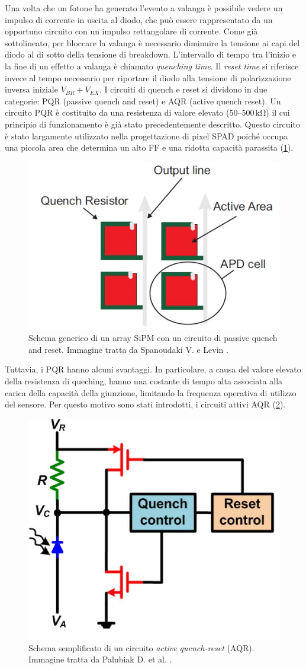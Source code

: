 Una volta che un fotone ha generato l'evento a valanga è possibile vedere un impulso di corrente in uscita al diodo, che può essere rappresentato da un opportuno circuito con un impulso rettangolare di corrente. Come già sottolineato, per bloccare la valanga è necessario diminuire la tensione ai capi del diodo al di sotto della tensione di breakdown. L'intervallo di tempo tra l'inizio e la fine di un effetto a valanga è chiamato \textit{quenching time}. Il \textit{reset time} si riferisce invece al tempo necessario per riportare il diodo alla tensione di polarizzazione inversa iniziale $V_{BR}+V_{EX}$. I circuiti di quench e reset si dividono in due categorie: PQR (passive quench and reset) e AQR (active quench reset). Un circuito PQR è costituito da una resistenza di valore elevato (\numrange[range-phrase=--]{50}{500}\,\unit{\kilo\ohm}) il cui principio di funzionamento è già stato precedentemente descritto. Questo circuito è stato largamente utilizzato nella progettazione di pixel SPAD poiché occupa una piccola area che determina un alto FF e una ridotta capacità parassita (\Fig\ref{fig:pqr_array}). 
\begin{figure}[t]
	\centering
	\includegraphics[width=0.6\linewidth]{./ImageFiles/pqr_pixels.jpg}
	\caption{Schema generico di un array SiPM con un circuito di passive quench and reset. Immagine tratta da Spanoudaki V. e Levin \cite{Spanoudaki2010}.}
	\label{fig:pqr_array}
\end{figure} 
Tuttavia, i PQR hanno alcuni svantaggi. In particolare, a causa del valore elevato della resistenza di queching, hanno una costante di tempo alta associata alla carica della capacità della giunzione, limitando la frequenza operativa di utilizzo del sensore. Per questo motivo sono stati introdotti, i circuiti attivi AQR (\Fig\ref{fig:aqr}).
\begin{figure}[b]
	\centering
	\includegraphics[width=0.35\linewidth]{./ImageFiles/aqr.jpg}
	\caption{Schema semplificato di un circuito \textit{active quench-reset} (AQR). Immagine tratta da Palubiak D. et al. \cite{Palubiak2011}.}
	\label{fig:aqr}
\end{figure} 
